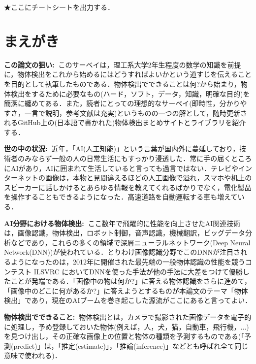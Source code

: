 \documentclass[originalpaper]{jsaiart}     %
\author{%
 \name{金子}{純也}{Junya Kaneko}
 \affiliation{Morning Project Samurai 株式会社}%
     {Morning Project Samurai Inc.}%
     {junya@mpsamurai.com, http://www.mpsamurai.com}
\and
 \name{山田}{貢己}{Miki Yamada}
 \sameaffiliation{m.yamada@mpsamurai.com}
}
\begin{document}
\maketitle

★ここにチートシートを出力する．
\section{まえがき}
{\bf この論文の狙い:\ }このサーベイは，理工系大学2年生程度の数学の知識を前提に，物体検出をこれから始めるにはどうすればよいかという道すじを伝えることを目的として執筆したものである．物体検出でできることは何?から始まり，物体検出をするために必要なもの(ハード，ソフト，データ，知識，明確な目的)を簡潔に纏めてある．また，読者にとっての理想的なサーベイ(即時性，分かりやすさ，一言で説明，参考文献は充実)というものの一つの解として，随時更新されるGitHub上の(日本語で書かれた)物体検出まとめサイトとライブラリを紹介する．

{\bf 世の中の状況:\ }近年，「AI(人工知能)」という言葉が国内外に蔓延しており，技術者のみならず一般の人の日常生活にもすっかり浸透した．常に手の届くところにAIがあり，AIに囲まれて生活していると言っても過言ではない．テレビやインターネットの画像は，本物と見間違えるほどの人工画像で溢れ，スマホや机上のスピーカーに話しかけるとあらゆる情報を教えてくれるばかりでなく，電化製品を操作することもできるようになった．高速道路を自動運転する車も増えている．

{\bf AI分野における物体検出:\ }ここ数年で飛躍的に性能を向上させたAI関連技術は，画像認識，物体検出，ロボット制御，音声認識，機械翻訳，ビッグデータ分析などであり，これらの多くの領域で深層ニューラルネットワーク(Deep Neural Network(DNN))が使われている．とりわけ画像認識分野でこのDNNが注目されるようになったのは，2012年に開催された最先端の一般物体認識の性能を競うコンテスト ILSVRC においてDNNを使った手法が他の手法に大差をつけて優勝したことが発端である．「画像中の物は何か?」に答える物体認識をさらに進めて，「画像中のどこに何があるか?」に答えようとするものが本論文のテーマ「物体検出」であり，現在のAIブームを巻き起こした源流がここにあると言ってよい．

{\bf 物体検出でできること:\ }物体検出とは，カメラで撮影された画像データを電子的に処理し，予め登録しておいた物体(例えば，人，犬，猫，自動車，飛行機，...)を見つけ出し，その正確な画像上の位置と物体の種類を予測するものである(「予測(predict)」は，「推定(estimate)」，「推論(inference)」などとも呼ばれ全て同じ意味で使われる)．
\end{document}

